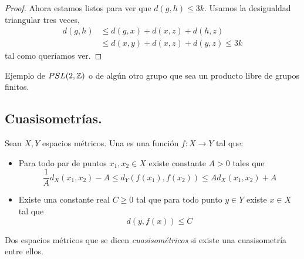 \documentclass[tesis.tex]{subfiles}
\begin{document}
\begin{proof}
Ahora estamos listos para ver que $d(g,h) \le 3k$. Usamos la desigualdad triangular tres veces,
\begin{align*}
	d(g,h) & \le d(g,x) + d(x,z) + d(h,z) \\
	& \le d(x,y) + d(x,z) + d(y,z) \le 3k
\end{align*}
tal como queríamos ver.
\end{proof}

\begin{ej}
	Ejemplo de $PSL(2,\mathbb Z)$ o de algún otro grupo que sea un producto libre de grupos finitos.
\end{ej}


\subsection{Cuasisometrías.}


\begin{deff}
	Sean $X,Y$ espacios métricos. Una  es una función $f:X \to Y$ tal que:
	\begin{itemize}
	\item Para todo par de puntos $x_1,x_2 \in X$ existe constante $A > 0$ tales que
	\[
	\frac{1}{A} d_X(x_1,x_2) - A \le d_Y(f(x_1),f(x_2)) \le A d_X(x_1,x_2) + A
	\]
	\item Existe una constante real $C \ge 0$ tal que para todo punto $y \in Y$ existe $x \in X$ tal que 
	\[
	d(y,f(x)) \le C
	\]
	\end{itemize}
 	Dos espacios métricos que se dicen \emph{cuasisométricos} si existe una cuasisometría entre ellos.
\end{deff}
\end{document}
